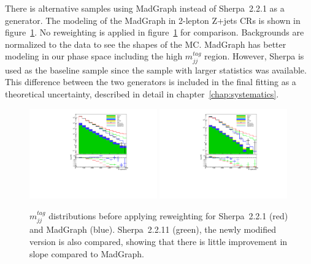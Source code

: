 There is alternative samples using MadGraph instead of Sherpa~2.2.1 as a generator. 
The modeling of the MadGraph in 2-lepton Z+jets CRs is shown in figure~\ref{fig:SherpaMadGraph}. 
No reweighting is applied in figure~\ref{fig:SherpaMadGraph} for comparison. 
Backgrounds are normalized to the data to see the shapes of the MC. 
MadGraph has better modeling in our phase space including the high $m^{tag}_{jj}$ region. 
However, Sherpa is used as the baseline sample since the sample with larger statistics was available.
This difference between the two generators is included in the final fitting as a theoretical uncertainty, described in detail in chapter~\ref{chap:systematics}.
\begin{figure}[ht]
    \centering
    \includegraphics[width=0.49\textwidth]{figures/2lep/reweighting/MTagResJets_0ptag2pjet_0ptv_CRVjet_ratio.pdf}
    \includegraphics[width=0.49\textwidth]{figures/2lep/reweighting/MTagMerJets_0ptag1pfat0pjet_0ptv_CRVjet_ratio.pdf}
    \caption{ $m^{tag}_{jj}$ distributions before applying reweighting for Sherpa~2.2.1 (red) and MadGraph (blue). Sherpa~2.2.11 (green), the newly modified version is also compared, showing that there is little improvement in slope compared to MadGraph.}
    \label{fig:SherpaMadGraph}
\end{figure}


